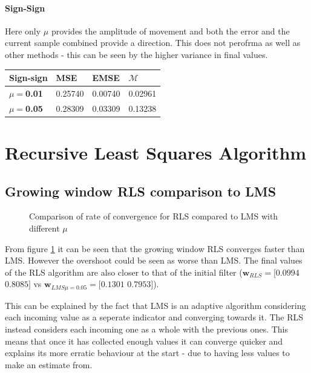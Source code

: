 \documentclass[10pt,twoside,a4paper]{report}
\begin{document}
\paragraph{Sign-Sign} Here only $\mu$ provides the amplitude of movement and both the error and the current sample combined provide a direction. This does not perofrma as well as other methods - this can be seen by the higher variance in final values.
\begin{table}[h!]
\centering
\begin{tabular}{|l|l|l|l|}
\hline
Sign-sign              & \textbf{MSE} & \textbf{EMSE} & $\mathcal{M}$ \\ \hline
$\mu=$\textbf{0.01} & 0.25740       & 0.00740        & 0.02961        \\ \hline
$\mu=$\textbf{0.05} & 0.28309       & 0.03309        & 0.13238        \\ \hline
\end{tabular}
\end{table}

\section{Recursive Least Squares Algorithm}
\subsection{Growing window RLS comparison to LMS}
\FloatBarrier
\begin{figure}[h!]
\centering
\resizebox{\textwidth}{!}{}
\caption{Comparison of rate of convergence for RLS compared to LMS with different $\mu$}
\label{fig:3_2a}
\end{figure}

From figure \ref{fig:3_2a} it can be seen that the growing window RLS converges faster than LMS. However the overshoot could be seen as worse than LMS. The final values of the RLS algorithm are also closer to that of the initial filter ($\mathbf{w}_{RLS} = [0.0994$ $ 0.8085]$ vs $\mathbf{w}_{LMS \mu=0.05} = [0.1301$ $0.7953]$). 

This can be explained by the fact that LMS is an adaptive algorithm considering each incoming value as a seperate indicator and converging towards it. The RLS instead considers each incoming one as a whole with the previous ones. This means that once it has collected enough values it can converge quicker and explains its more erratic behaviour at the start - due to having less values to make an estimate from.
\end{document}
